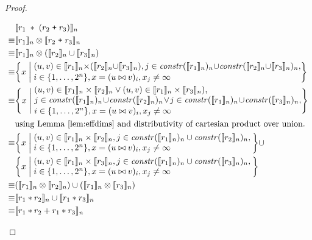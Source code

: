 \begin{proof}
\begin{description}
    \begin{align*}
             & \interp{r_1 \; \ast \; (r_2 \; \texttt{+} \; r_3)}_n \\
      \equiv & \interp{r_1}_n \otimes \interp{r_2 \; \texttt{+} \; r_3}_n \\
      \equiv & \interp{r_1}_n \otimes (\interp{r_2}_n \cup \interp{r_3}_n) \\
      \equiv &
  \bigg\{x \; \bigg| \;
    \parbox{11cm}{$(u, v) \in \interp{r_1}_n \times (\interp{r_2}_n \cup \interp{r_3}_n),
                   j \in \effdims{\interp{r_1}_n}{n} \cup
                         \effdims{\interp{r_2}_n \cup 
                         \interp{r_3}_n}{n},$ \\[0.1em]
                  $i \in \{1, \ldots, 2^n\}, 
                   x = (u \bowtie v)_i, x_j \neq \infty$
                  } \bigg\} \\
      \equiv &
  \Bigg\{x \; \Bigg| \;
    \parbox{11cm}{$(u, v) \in \interp{r_1}_n \times \interp{r_2}_n \vee (u, v) \in \interp{r_1}_n \times \interp{r_3}_n), \\
                   j \in \effdims{\interp{r_1}_n}{n} \cup
                          \effdims{\interp{r_2}_n}{n} \vee
                    j \in \effdims{\interp{r_1}_n}{n} \cup
                          \effdims{\interp{r_3}_n}{n},$ \\ [0.1em]
                  $i \in \{1, \ldots, 2^n\},
                   x = (u \bowtie v)_i, x_j \neq \infty$
                  } \Bigg\} \\
             & \mbox{using Lemma~\ref{lem:effdims} and distributivity of cartesian product over union.} \\
      \equiv &
  \bigg\{x \; \bigg| \;
    \parbox{9cm}{$(u, v) \in \interp{r_1}_n \times \interp{r_2}_n,
                  j \in \effdims{\interp{r_1}_n}{n} \cup
                        \effdims{\interp{r_2}_n}{n},$ \\
                 $i \in \{1, \ldots, 2^n\}, 
                  x = (u \bowtie v)_i, x_j \neq \infty$
                  } \bigg\} \cup \\
  & \bigg\{x \; \bigg| \;
    \parbox{9cm}{$(u, v) \in \interp{r_1}_n \times \interp{r_3}_n,
                  j \in \effdims{\interp{r_1}_n}{n} \cup 
                        \effdims{\interp{r_3}_n}{n},$ \\
                 $i \in \{1, \ldots, 2^n\},
                  x = (u \bowtie v)_i, x_j \neq \infty$
                  } \bigg\} \\
      \equiv & (\interp{r_1}_n \otimes \interp{r_2}_n)
        \cup (\interp{r_1}_n \otimes \interp{r_3}_n) \\
      \equiv & \interp{r_1 \ast r_2}_n \cup \interp{r_1 \ast r_3}_n \\
      \equiv & \interp{r_1 \ast r_2 + r_1 \ast r_3}_n \\
    \end{align*}
\end{description}
\end{proof}
